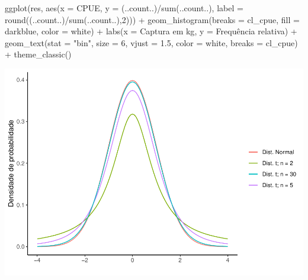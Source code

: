 \documentclass[
]{book}
\newenvironment{Shaded}{\begin{snugshade}}{\end{snugshade}}
\newcommand{\AttributeTok}[1]{\textcolor[rgb]{0.77,0.63,0.00}{#1}}
\newcommand{\DecValTok}[1]{\textcolor[rgb]{0.00,0.00,0.81}{#1}}
\newcommand{\FloatTok}[1]{\textcolor[rgb]{0.00,0.00,0.81}{#1}}
\newcommand{\FunctionTok}[1]{\textcolor[rgb]{0.00,0.00,0.00}{#1}}
\newcommand{\NormalTok}[1]{#1}
\newcommand{\SpecialCharTok}[1]{\textcolor[rgb]{0.00,0.00,0.00}{#1}}
\newcommand{\StringTok}[1]{\textcolor[rgb]{0.31,0.60,0.02}{#1}}
\begin{document}
\begin{Shaded}
\begin{Highlighting}[]
\FunctionTok{ggplot}\NormalTok{(res, }\FunctionTok{aes}\NormalTok{(}\AttributeTok{x =}\NormalTok{ CPUE,}
                \AttributeTok{y =}\NormalTok{ (..count..)}\SpecialCharTok{/}\FunctionTok{sum}\NormalTok{(..count..),}
                \AttributeTok{label =} \FunctionTok{round}\NormalTok{((..count..)}\SpecialCharTok{/}\FunctionTok{sum}\NormalTok{(..count..),}\DecValTok{2}\NormalTok{))) }\SpecialCharTok{+}
  \FunctionTok{geom\_histogram}\NormalTok{(}\AttributeTok{breaks =}\NormalTok{ cl\_cpue, }
                 \AttributeTok{fill =} \StringTok{\textquotesingle{}darkblue\textquotesingle{}}\NormalTok{, }\AttributeTok{color =} \StringTok{\textquotesingle{}white\textquotesingle{}}\NormalTok{) }\SpecialCharTok{+}
  \FunctionTok{labs}\NormalTok{(}\AttributeTok{x =} \StringTok{\textquotesingle{}Captura em kg\textquotesingle{}}\NormalTok{, }\AttributeTok{y =} \StringTok{\textquotesingle{}Frequência relativa\textquotesingle{}}\NormalTok{) }\SpecialCharTok{+}
  \FunctionTok{geom\_text}\NormalTok{(}\AttributeTok{stat =} \StringTok{"bin"}\NormalTok{, }\AttributeTok{size =} \DecValTok{6}\NormalTok{, }\AttributeTok{vjust =} \FloatTok{1.5}\NormalTok{, }\AttributeTok{color =} \StringTok{\textquotesingle{}white\textquotesingle{}}\NormalTok{,}
            \AttributeTok{breaks =}\NormalTok{ cl\_cpue) }\SpecialCharTok{+}
  \FunctionTok{theme\_classic}\NormalTok{()}
\end{Highlighting}
\end{Shaded}

\includegraphics{probest-cambientais_files/figure-latex/unnamed-chunk-111-1.pdf}
\end{document}

